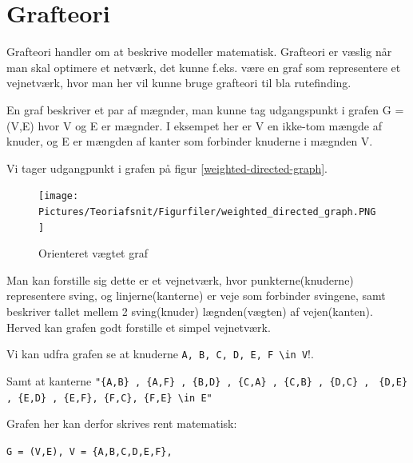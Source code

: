 \section{Grafteori}

Grafteori handler om at beskrive  modeller matematisk. Grafteori er væslig når man skal optimere et netværk, det kunne f.eks. være en graf som representere et vejnetværk, hvor man her vil kunne bruge grafteori til bla rutefinding.  

En graf beskriver et par af mægnder, man kunne tag udgangspunkt i grafen G = (V,E) hvor V og E er mægnder. I eksempet her er V en ikke-tom mængde af knuder, og E er mængden af kanter som forbinder knuderne i mægnden V. 

\vspace{5mm}

Vi tager udgangpunkt i grafen på figur \ref{weighted-directed-graph}.

\begin{figure}[H]
\begin{adjustbox}{width=0.5\textwidth,center=\textwidth}
\centering
\texttt{[image: Pictures/Teoriafsnit/Figurfiler/weighted\_directed\_graph.PNG]}
\end{adjustbox}
\caption{Orienteret vægtet graf}
\label{fig:weighted-directed-graph}
\end{figure}

\vspace{5mm}

Man kan forstille sig dette er et vejnetværk, hvor punkterne(knuderne) representere sving, og linjerne(kanterne) er veje som forbinder svingene, samt beskriver tallet mellem 2 sving(knuder) lægnden(vægten) af vejen(kanten). Herved kan grafen godt forstille et simpel vejnetværk.

\vspace{5mm}

Vi kan udfra grafen se at knuderne \verb"A, B, C, D, E, F \in V"!. 

\vspace{5mm}

Samt at kanterne \verb!"{A,B} , {A,F} , {B,D} , {C,A} , {C,B} , {D,C} ,!
\verb! {D,E} , {E,D} , {E,F}, {F,C}, {F,E} \in E"!

\vspace{5mm}

Grafen her kan derfor skrives rent matematisk:

\vspace{5mm}

\verb!G = (V,E), V = {A,B,C,D,E,F},! 

